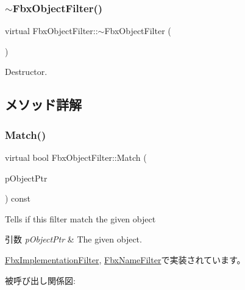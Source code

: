 \subsubsection{\texorpdfstring{$\sim$\+Fbx\+Object\+Filter()}{~FbxObjectFilter()}}
{\footnotesize\ttfamily virtual Fbx\+Object\+Filter\+::$\sim$\+Fbx\+Object\+Filter (\begin{DoxyParamCaption}{ }\end{DoxyParamCaption})\hspace{0.3cm}{\ttfamily [virtual]}}



Destructor. 



\subsection{メソッド詳解}
\mbox{\label{class_fbx_object_filter_a49cc7b7c109f98910241d62ec0bd093b}} 
\subsubsection{\texorpdfstring{Match()}{Match()}}
{\footnotesize\ttfamily virtual bool Fbx\+Object\+Filter\+::\+Match (\begin{DoxyParamCaption}\item[{const \hyperlink{class_fbx_object}{Fbx\+Object} $\ast$}]{p\+Object\+Ptr }\end{DoxyParamCaption}) const\hspace{0.3cm}{\ttfamily [pure virtual]}}

Tells if this filter match the given object 
\begin{DoxyParams}{引数}
{\em p\+Object\+Ptr} & The given object. \\
\hline
\end{DoxyParams}


\hyperlink{class_fbx_implementation_filter_a59ab32592ea71f1853f1cc5f641a341d}{Fbx\+Implementation\+Filter}, \hyperlink{class_fbx_name_filter_a2767c75f626baed7800308f937302743}{Fbx\+Name\+Filter}で実装されています。

被呼び出し関係図\+:
\mbox{\label{class_fbx_object_filter_a1920c73e0044a43ae151175d788e7674}} 
